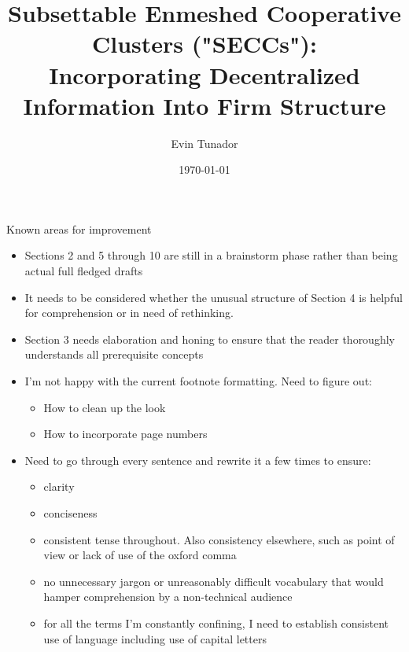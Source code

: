 \documentclass{article}[10pt]
\begin{document}
\begin{center}
    \color{red}
    Known areas for improvement
\end{center}

\begin{itemize}
    \color{red}
    \item Sections 2 and 5 through 10 are still in a brainstorm phase rather than being actual full fledged drafts
    \item It needs to be considered whether the unusual structure of Section 4 is helpful for comprehension or in need of rethinking.
    \item Section 3 needs elaboration and honing to ensure that the reader thoroughly understands all prerequisite concepts
    \item I'm not happy with the current footnote formatting. Need to figure out:
    \begin{itemize}
        \item How to clean up the look
        \item How to incorporate page numbers
    \end{itemize}
    \item Need to go through every sentence and rewrite it a few times to ensure:
    \begin{itemize}
        \item clarity
        \item conciseness
        \item consistent tense throughout. Also consistency elsewhere, such as point of view or lack of use of the oxford comma
        \item no unnecessary jargon or unreasonably difficult vocabulary that would hamper comprehension by a non-technical audience
    \item for all the terms I'm constantly confining, I need to establish consistent use of language including use of capital letters
    \end{itemize}
\end{itemize}

\newpage

\fancyhead{} %
\renewcommand{\headrulewidth}{0pt}

\title{Subsettable Enmeshed Cooperative Clusters ("SECCs"):\\
Incorporating Decentralized Information Into Firm Structure}
\author{Evin Tunador}
\date{\today}
\maketitle
\thispagestyle{fancy}
\end{document}
